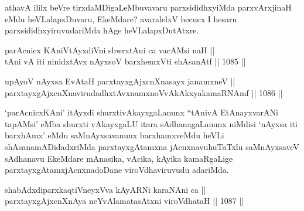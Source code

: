 \begin{artha}
athavA ililx beVre tirxdaMDigaLeMbuvavaru parxsididhxyiMda parxvArxjinaH eMdu heVLalapxDuvaru, EkeMdare? avaralelxV hecucx I hesaru parxsididhxyiruvudariMda hAge heVLalapxDutAtxre.
\end{artha}


\begin{shl}
\footnotemark[1]parAcnicx KAniVtAyxdiVni shwrxtAni ca vacAMsi naH || \\
\footnotemark[2]tAni vA iti ninidxtAvx \footnotemark[3]nAyxsoV barxhemxVti shAsanAtf ||  1085 ||  
\end{shl}
				
\begin{shl}
upAyoV nAyxsa EvAtaH parxtayxgAjxcnXnasayx janamxneV || \\
parxtayxgAjxcnXnavirudadhxtAvxnamxnoVvAkAkxyakamaRNAmf ||  1086 ||  
\end{shl}

\begin{artha}
`parAcnicxKAni' itAyxdi shurxtivAkayxgaLanunx ``tAnivA EtAnayxvarANi tapAMsi' eMba shurxti vAkayxgaLU itara sAdhanagaLanunx niMdisi `nAyxsa iti barxhAmx' eMdu saMnAyxsavanunx barxhamxveMdu heVLi shAsanamADidadxriMda parxtayxgAtamxna jAcnxnavuhuTaTxlu saMnAyxsaveV sAdhanavu EkeMdare mAnasika, vAcika, kAyika kamaRgaLige parxtayxgAtamxjAcnxnadoDane viroVdhaviruvudu adariMda.
\end{artha}


\begin{shl}
shabAdxdiparxkaqtiVneyxVva kAyARNi karaNAni ca || \\
parxtayxgAjxcnXnAya neYvAlamatasAtxni viroVdhataH ||  1087 ||  
\end{shl}	

